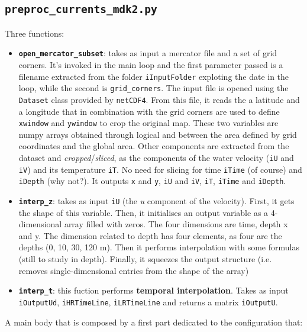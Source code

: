 \subsection{\texttt{preproc\_currents\_mdk2.py}}

Three functions:

\begin{itemize}
    \item \textbf{\texttt{open\_mercator\_subset}}: takes as input a mercator file and a set of grid corners. It's invoked in the main loop and the first parameter passed is a filename extracted from the folder \texttt{iInputFolder} exploting the date in the loop, while the second is \texttt{grid\_corners}.
    The input file is opened using the \texttt{Dataset} class provided by \texttt{netCDF4}. From this file, it reads the a latitude and a longitude that in combination with the grid corners are used to define \texttt{xwindow} and \texttt{ywindow} to crop the original map. These two variables are numpy arrays obtained through logical and between the area defined by grid coordinates and the global area. Other components are extracted from the dataset and \textit{cropped}/\textit{sliced}, as the components of the water velocity (\texttt{iU} and \texttt{iV}) and its temperature \texttt{iT}. No need for slicing for time \texttt{iTime} (of course) and \texttt{iDepth} (why not?).
    It outputs \texttt{x} and \texttt{y}, \texttt{iU} and \texttt{iV}, \texttt{iT}, \texttt{iTime} and \texttt{iDepth}.

    \item \textbf{\texttt{interp\_z}}: takes as input \texttt{iU} (the \textit{u} component of the velocity). First, it gets the shape of this variable. Then, it initialises an output variable as a 4-dimensional array filled with zeros. The four dimensions are time, depth x and y. The dimension related to depth has four elements, as four are the depths (0, 10, 30, 120 m). Then it performs interpolation with some formulas (still to study in depth).
    Finally, it squeezes the output structure (i.e. removes single-dimensional entries from the shape of the array)
    
    \item \textbf{\texttt{interp\_t}}: this fuction performs \textbf{temporal interpolation}. Takes as input \texttt{iOutputUd}, \texttt{iHRTimeLine}, \texttt{iLRTimeLine} and returns a matrix \texttt{iOutputU}.
\end{itemize}

A main body that is composed by a first part dedicated to the configuration that:

